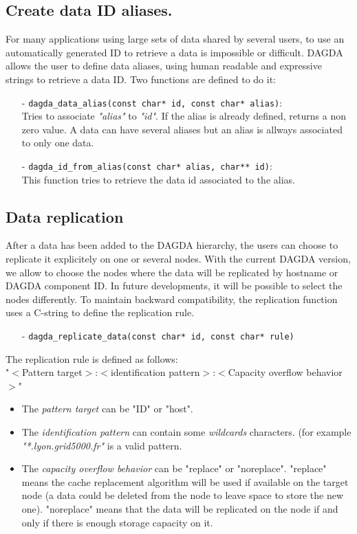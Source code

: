 \subsection{Create data ID aliases.}
For many applications using large sets of data shared by several users, to
use an automatically generated ID to retrieve a data is impossible or difficult.
DAGDA allows the user to define data aliases, using human readable and
expressive strings to retrieve a data ID. Two functions are defined to do it:
\begin{itemize}
\item[-] \verb#dagda_data_alias(const char* id, const char* alias)#:\\
  Tries to associate \textit{"alias"} to \textit{"id"}. If the alias is
  already defined, returns a non zero value. A data can have several aliases
  but an alias is allways associated to only one data.
\item[-] \verb#dagda_id_from_alias(const char* alias, char** id)#:\\
  This function tries to retrieve the data id associated to the alias.
\end{itemize}

\subsection{Data replication}
After a data has been added to the DAGDA hierarchy, the users can choose to
replicate it explicitely on one or several \diet nodes. With the current
DAGDA version, we allow to choose the nodes where the data will be replicated
by hostname or DAGDA component ID. In future developments, it will be
possible to select the nodes differently. To maintain backward compatibility,
the replication function uses a C-string to define the replication rule.
\begin{itemize}
\item[-] \verb#dagda_replicate_data(const char* id, const char* rule)#
\end{itemize}
The replication rule is defined as follows:\\
"$<$Pattern target$>$:$<$identification pattern$>$:$<$Capacity overflow
behavior$>$"\\
\begin{itemize}
\item The \textit{pattern target} can be "ID" or "host".
\item The \textit{identification pattern} can contain some \textit{wildcards}
  characters. (for example \textit{"*.lyon.grid5000.fr"} is a valid pattern.
\item The \textit{capacity overflow behavior} can be "replace" or "noreplace".
  "replace" means the cache replacement algorithm will be used if available on
  the target node (a data could be deleted from the node to leave space to
  store the new one). "noreplace" means that the data will be replicated on
  the node if and only if there is enough storage capacity on it.
\end{itemize}

